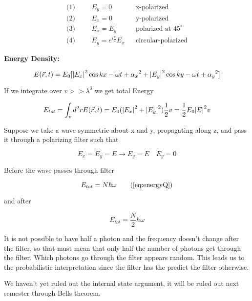 \begin{align}
  \text{(1)} &&& E_y = 0 && \text{x-polarized} \\
  \text{(2)} &&& E_x = 0 && \text{y-polarized} \\
  \text{(3)} &&& E_x = E_y && \text{polarized at } 45^{\circ} \\
  \text{(4)} &&& E_y = e^{i \frac{\pi}{2}}E_x && \text{circular-polarized}
\end{align}

\textbf{Energy Density:}

\begin{equation}
  E(\vec{r}, t) = E_0[\abs{E_x}^{2} \cos{kx - \omega t + \alpha_x}^{2} +\abs{E_y}^{2} \cos{ky - \omega t + \alpha_y}^{2}]
\end{equation}

If we integrate over $ v >> \lambda^{3}$ we get total Energy

\begin{equation}
  E_{tot} = \int_{v} d^{2}r E(\vec{r}, t) = E_0(\abs{E_x}^2 + \abs{E_y}^2)\frac{1}{2}v = \frac{1}{2}E_0\abs{E}^2v
\end{equation}

Suppose we take a wave symmetric about x and y, propagating along z, and pass it through a polarizing filter such that

\begin{equation}
  E_x = E_y = E \rightarrow E_y = E \quad E_y = 0
\end{equation}

Before the wave passes through filter

\begin{equation}
  E_{tot} = N \hbar \omega \tag{\ref{eq:energyQ}}
\end{equation}

and after

\begin{equation}
  E_{tot} = \frac{N}{2} \hbar \omega
\end{equation}

It is not possible to have half a photon and the frequency doesn't change after the filter, so that must mean that only half the number of photons get through the filter. Which photons go through the filter appears random. This leads us to the probabilistic interpretation since the filter has the predict the filter otherwise.

We haven't yet ruled out the internal state argument, it will be ruled out next semester through Bells theorem.

